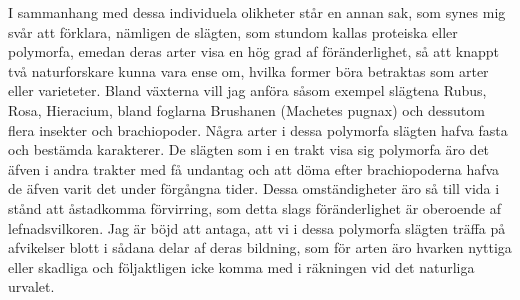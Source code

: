 I sammanhang med dessa individuela olikheter står en annan sak, som synes mig svår att förklara, nämligen de slägten, som stundom kallas proteiska eller polymorfa, emedan deras arter visa en hög grad af föränderlighet, så att knappt två naturforskare kunna vara ense om, hvilka former böra betraktas som arter eller varieteter. Bland växterna vill jag anföra såsom exempel slägtena Rubus, Rosa, Hieracium, bland foglarna Brushanen (Machetes pugnax) och dessutom flera insekter och brachiopoder. Några arter i dessa polymorfa slägten hafva fasta och bestämda karakterer. De slägten som i en trakt visa sig polymorfa äro det äfven i andra trakter med få undantag och att döma efter brachiopoderna hafva de äfven varit det under förgångna tider. Dessa omständigheter äro så till vida i stånd att åstadkomma förvirring, som detta slags föränderlighet är oberoende af lefnadsvilkoren. Jag är böjd att antaga, att vi i dessa polymorfa slägten träffa på afvikelser blott i sådana delar af deras bildning, som för arten äro hvarken nyttiga eller skadliga och följaktligen icke komma med i räkningen vid det naturliga urvalet.

